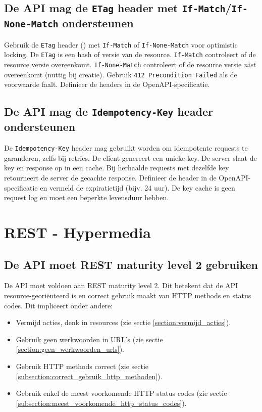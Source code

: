 \subsection{De API mag de \texttt{ETag} header met \texttt{If-Match}/\texttt{If-None-Match} ondersteunen}
\label{subsection:etag_header}

Gebruik de \texttt{ETag} header (\autocite{rfc9110}) met \texttt{If-Match} of \texttt{If-None-Match} voor optimistic locking. De \texttt{ETag} is een hash of versie van de resource. \texttt{If-Match} controleert of de resource versie overeenkomt. \texttt{If-None-Match} controleert of de resource versie \textit{niet} overeenkomt (nuttig bij creatie). Gebruik \texttt{412 Precondition Failed} als de voorwaarde faalt. Definieer de headers in de OpenAPI-specificatie.

\subsection{De API mag de \texttt{Idempotency-Key} header ondersteunen}
\label{subsection:idempotency_key_header}

De \texttt{Idempotency-Key} header mag gebruikt worden om idempotente requests te garanderen, zelfs bij retries. De client genereert een unieke key. De server slaat de key en response op in een cache. Bij herhaalde requests met dezelfde key retourneert de server de gecachte response. Definieer de header in de OpenAPI-specificatie en vermeld de expiratietijd (bijv. 24 uur). De key cache is geen request log en moet een beperkte levensduur hebben.

\section{REST - Hypermedia}

\subsection{De API moet REST maturity level 2 gebruiken}
\label{subsection:maturity_level_2}

De API moet voldoen aan REST maturity level 2. Dit betekent dat de API resource-georiënteerd is en correct gebruik maakt van HTTP methods en status codes. Dit impliceert onder andere:

\begin{itemize}
  \item Vermijd acties, denk in resources (zie sectie \ref{section:vermijd_acties}).
  \item Gebruik geen werkwoorden in URL's (zie sectie \ref{section:geen_werkwoorden_urls}).
  \item Gebruik HTTP methods correct (zie sectie \ref{subsection:correct_gebruik_http_methoden}).
  \item Gebruik enkel de meest voorkomende HTTP status codes (zie sectie \ref{subsection:meest_voorkomende_http_status_codes}).
\end{itemize}


